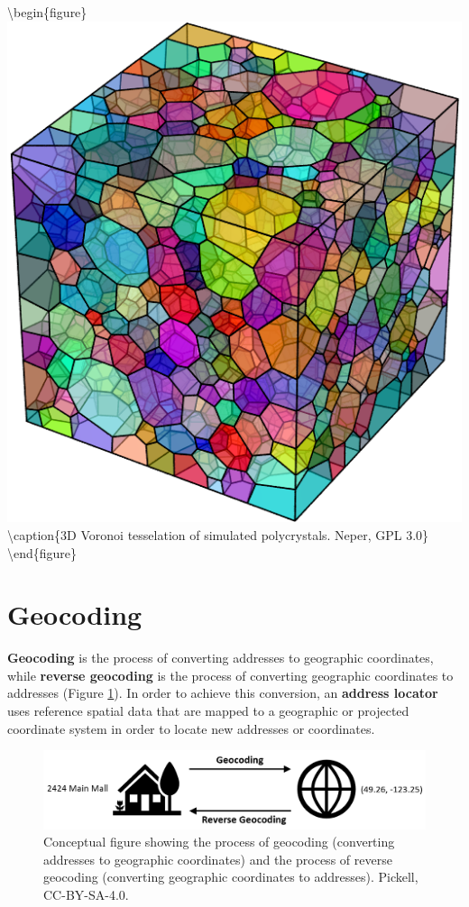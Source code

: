 \documentclass[
]{book}
\begin{document}
\textbackslash begin\{figure\}
\includegraphics[width=0.75\linewidth]{images/07-neper} \textbackslash caption\{3D Voronoi tesselation of simulated polycrystals. Neper, GPL 3.0\}\label{fig:7-neper}
\textbackslash end\{figure\}

\hypertarget{geocoding}{%
\section{Geocoding}\label{geocoding}}

\textbf{Geocoding} is the process of converting addresses to geographic coordinates, while \textbf{reverse geocoding} is the process of converting geographic coordinates to addresses (Figure \ref{fig:7-geocoding}). In order to achieve this conversion, an \textbf{address locator} uses reference spatial data that are mapped to a geographic or projected coordinate system in order to locate new addresses or coordinates.

\begin{figure}
\includegraphics[width=0.75\linewidth]{images/07-geocoding} \caption{Conceptual figure showing the process of geocoding (converting addresses to geographic coordinates) and the process of reverse geocoding (converting geographic coordinates to addresses). Pickell, CC-BY-SA-4.0.}\label{fig:7-geocoding}
\end{figure}
\end{document}
